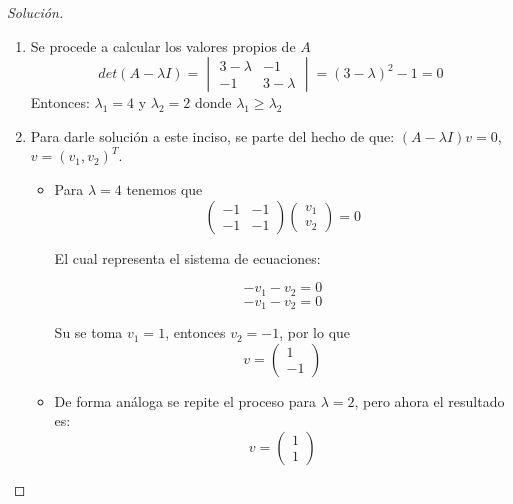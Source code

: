 \documentclass[12pt]{book}
\newenvironment{solucion}
  {\renewcommand\qedsymbol{$\square$}\begin{proof}[Solución]}
  {\end{proof}}
\begin{document}
\begin{solucion}
\begin{enumerate}
    \item Se procede a calcular los valores propios de $A$
        \[
            det(A-\lambda I)=\begin{vmatrix}
                3-\lambda & -1 \\
                -1 & 3-\lambda
            \end{vmatrix}=(3-\lambda)^2-1=0
        \]
    Entonces: $\lambda_1=4$ y $\lambda_2=2$ donde $\lambda_1\geq\lambda_2$
    \item Para darle solución a este inciso, se parte del hecho de que: $(A-\lambda I)v=0$, $v=(v_1,v_2)^T$.
        \begin{itemize}
            \item Para $\lambda=4$ tenemos que
                \[\begin{pmatrix}
                -1 & -1\\
                -1 & -1
                \end{pmatrix}\begin{pmatrix}
                v_1\\
                v_2
                \end{pmatrix}=0\]
                
                El cual representa el sistema de ecuaciones:
                
                \[-v_1-v_2=0\]
                \[-v_1-v_2=0\]
                
                Su se toma  $v_1=1$, entonces $v_2=-1$, por lo que 
                \[v=\begin{pmatrix}
                1\\
                -1
                \end{pmatrix}\]
            \item De forma análoga se repite el proceso para $\lambda=2$, pero ahora el resultado es:
                \[
                    v=\begin{pmatrix} 1\\ 1\end{pmatrix}
                \]
        \end{itemize}
    \end{enumerate}
\end{solucion}
\end{document}
